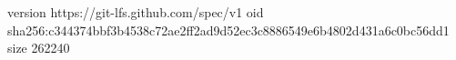 version https://git-lfs.github.com/spec/v1
oid sha256:c344374bbf3b4538c72ae2ff2ad9d52ec3c8886549e6b4802d431a6c0bc56dd1
size 262240
